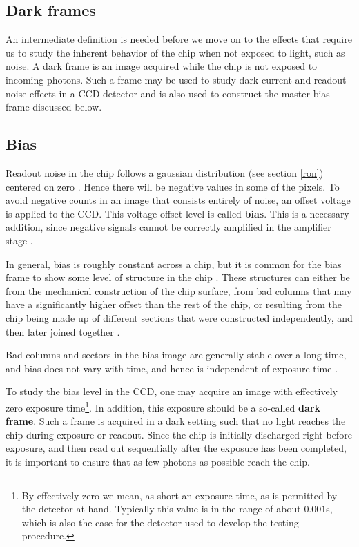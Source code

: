 \documentclass[../main.tex]{subfiles}
\begin{document}
	\subsection{Dark frames}
	An intermediate definition is needed before we move on to the effects that require us to study the inherent behavior of the chip when not exposed to light, such as noise. A dark frame is an image acquired while the chip is not exposed to incoming photons. Such a frame may be used to study dark current and readout noise effects in a CCD detector and is also used to construct the master bias frame discussed below.
	
	\subsection{Bias}
	Readout noise in the chip follows a gaussian distribution (see section \ref{ron}) centered on zero \cite{handbookofccdastronomy, CCDdatareductionguide}. Hence there will be negative values in some of the pixels. To avoid negative counts in an image that consists entirely of noise, an offset voltage is applied to the CCD. This voltage offset level is called \textbf{bias}. This is a necessary addition, since negative signals cannot be correctly amplified in the amplifier stage \cite{handbookofccdastronomy, CCDdatareductionguide}.
	
	In general, bias is roughly constant across a chip, but it is common for the bias frame to show some level of structure in the chip \cite{handbookofccdastronomy}. These structures can either be from the mechanical construction of the chip surface, from bad columns that may have a significantly higher offset than the rest of the chip, or resulting from the chip being made up of different sections that were constructed independently, and then later joined together \cite{CCDdatareductionguide}. 
	
	Bad columns and sectors in the bias image are generally stable over a long time, and bias does not vary with time, and hence is independent of exposure time \cite{CCDdatareductionguide}. 
	
	To study the bias level in the CCD, one may acquire an image with effectively zero exposure time\footnote{By effectively zero we mean, as short an exposure time, as is permitted by the detector at hand. Typically this value is in the range of about $0.001$s, which is also the case for the detector used to develop the testing procedure.}. In addition, this exposure should be a so-called \textbf{dark frame}. Such a frame is acquired in a dark setting such that no light reaches the chip during exposure or readout. Since the chip is initially discharged right before exposure, and then read out sequentially after the exposure has been completed, it is important to ensure that as few photons as possible reach the chip.
	
\end{document}
